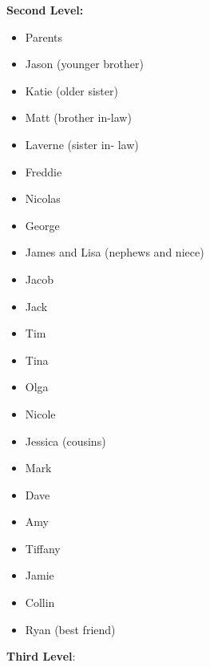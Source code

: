 \textbf{Second Level:}
\begin{multicols}{2}
\begin{itemize}[leftmargin=*]
\item Parents
\item Jason  \break(younger brother)
\item Katie  \break(older sister)
\item Matt  \break(brother in-law)
\item Laverne  \break(sister in- law)
\item Freddie
\item Nicolas
\item George
\item James and Lisa \break(nephews and niece)
\item Jacob
\item Jack
\item Tim
\item Tina
\item Olga
\item Nicole
\item Jessica (cousins)
\item Mark
\item Dave
\item Amy
\item Tiffany
\item Jamie
\item Collin
\item Ryan  \break(best friend)
 \end{itemize}
 \end{multicols}
\pagebreak \textbf{Third Level}:
